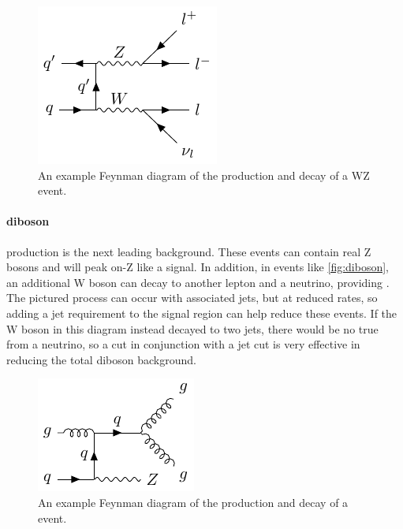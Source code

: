 \begin{centering}
\begin{figure}[bth]
\myfloatalign
\includegraphics[width=.70\linewidth]{feynman/diboson.pdf}
\caption{An example Feynman diagram of the production and decay of a WZ event.}
\label{fig:diboson}
\end{figure}
\end{centering}

\paragraph{diboson} production is the next leading background. These events can contain real Z bosons and will peak on-Z like a signal. In addition, in events like \autoref{fig:diboson}, an additional W boson can decay to another lepton and a neutrino, providing \MET. The pictured process can occur with associated jets, but at reduced rates, so adding a jet requirement to the signal region can help reduce these events. If the W boson in this diagram instead decayed to two jets, there would be no true \MET from a neutrino, so a \MET cut in conjunction with a jet cut is very effective in reducing the total diboson background. 

\begin{centering}
\begin{figure}[bth]
\myfloatalign
\includegraphics[width=.70\linewidth]{feynman/zjets.pdf}
\caption{An example Feynman diagram of the production and decay of a \dyjets event.}
\label{fig:zjets}
\end{figure}
\end{centering}

